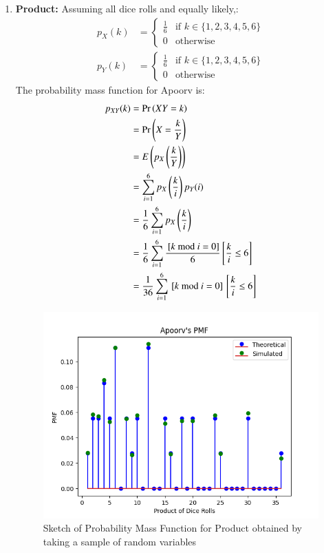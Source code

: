 \documentclass[journal,12pt,twocolumn]{IEEEtran}
\theoremstyle{remark}
\begin{document}
\begin{enumerate}
\item \textbf{Product:} Assuming all dice rolls and equally likely,:
    \begin{align}
        p_X(k) &= 
        \begin{cases}
            \frac{1}{6} & \text{if }k \in \{1, 2, 3, 4, 5, 6\}\\
            0 & \text{otherwise}
        \end{cases}\label{eq:1}\\
        p_Y(k) &=
        \begin{cases}
            \frac{1}{6} & \text{if }k \in \{1, 2, 3, 4, 5, 6\}\\
            0 & \text{otherwise}
        \end{cases}
    \end{align}
    The probability mass function for Apoorv is:
    \begin{align}
        p_{XY}(k) &= \Pr\left(XY = k\right)\\
        &= \Pr\left(X = \frac{k}{Y}\right)\\
        &= E\left(p_X\left(\frac{k}{Y}\right)\right)\\
        &= \sum_{i = 1}^{6} p_X\left(\frac{k}{i}\right) p_Y(i)\\
        &= \frac{1}{6} \sum_{i = 1}^{6} p_X\left(\frac{k}{i}\right)\\
        &= \frac{1}{6} \sum_{i = 1}^{6} \frac{{}\left[k \text{ mod } i = 0\right]}{6}{}\left[\frac{k}{i} \leq 6\right]\\
        &= \frac{1}{36} \sum_{i = 1}^{6} {}\left[k \text{ mod } i = 0\right]{}\left[\frac{k}{i} \leq 6\right]
    \end{align}
    \begin{figure}[h!]
        \centering
	\includegraphics[width=0.7\columnwidth]{exemplar/10/13/2/7/plots/Apoorv_PMF.png}
        \caption{Sketch of Probability Mass Function for Product obtained by taking a sample of random variables}

\end{figure}
\end{enumerate}
\end{document}
